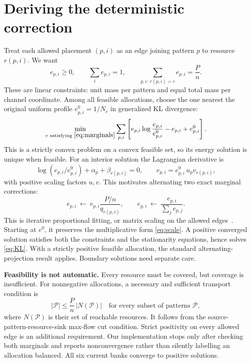 \documentclass[10pt,a4paper]{article}
\begin{document}
\clearpage
\section{Deriving the deterministic correction}
Treat each allowed placement $(p,i)$ as an edge joining pattern $p$ to resource $r(p,i)$. We want
\begin{equation}
 e_{p,i}\geq0,\qquad \sum_i e_{p,i}=1,\qquad
 \sum_{p,i:\,r(p,i)=r}e_{p,i}=\frac Pn.
 \label{eq:marginals}
\end{equation}
These are linear constraints: unit mass per pattern and equal total mass per channel coordinate. Among all feasible
allocations, choose the one nearest the original uniform profile $e^0_{p,i}=1/N_c$ in generalized KL divergence:
\begin{equation}
 \min_{e\text{ satisfying }\eqref{eq:marginals}}
 \sum_{p,i}\left[e_{p,i}\log\frac{e_{p,i}}{e^0_{p,i}}-e_{p,i}+e^0_{p,i}\right].
 \label{eq:KL}
\end{equation}
This is a strictly convex problem on a convex feasible set, so its energy solution is unique when feasible.
For an interior solution the Lagrangian derivative is
\begin{equation}
 \log(e_{p,i}/e^0_{p,i})+\alpha_p+\beta_{r(p,i)}=0,
 \qquad e_{p,i}=e^0_{p,i}\,u_pv_{r(p,i)},
 \label{eq:scale}
\end{equation}
with positive scaling factors $u,v$. This motivates alternating two exact marginal corrections:
\begin{equation}
 e_{p,i}\ \leftarrow\ e_{p,i}\frac{P/n}{q_{r(p,i)}},
 \qquad
 e_{p,i}\ \leftarrow\ \frac{e_{p,i}}{\sum_j e_{p,j}}.
 \label{eq:ipf}
\end{equation}
This is iterative proportional fitting, or matrix scaling on the allowed edges~\cite{csiszar}.
Starting at $e^0$, it preserves the multiplicative form \eqref{eq:scale}. A positive converged solution satisfies
both the constraints and the stationarity equations, hence solves \eqref{eq:KL}. With a strictly positive feasible
allocation, the standard alternating-projection result applies. Boundary solutions need separate care.

\textbf{Feasibility is not automatic.} Every resource must be covered, but coverage is insufficient.
For nonnegative allocations, a necessary and sufficient transport condition is
\begin{equation}
 |\mathcal P|\leq\frac Pn\,|N(\mathcal P)|\quad\text{for every subset of patterns }\mathcal P,
\end{equation}
where $N(\mathcal P)$ is their set of reachable resources. It follows from the source-pattern-resource-sink
max-flow cut condition. Strict positivity on every allowed edge is an additional requirement.
Our implementation stops only after checking both marginals and reports nonconvergence rather than silently
labelling an allocation balanced. All six current banks converge to positive solutions.
\end{document}
